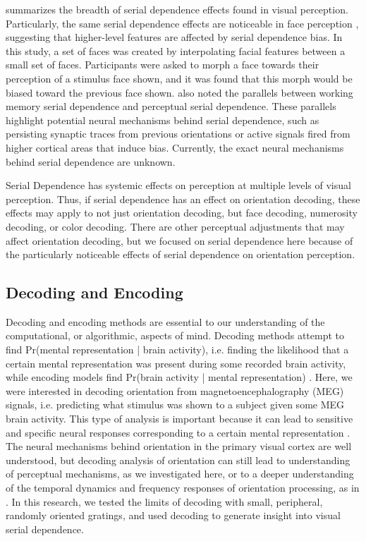 \documentclass[../main.tex]{subfiles}
\begin{document}
\cite{KIYONAGA2017493} summarizes the breadth of serial dependence effects found in visual perception. Particularly, the same serial dependence effects are noticeable in face perception \citep{liberman_2014}, suggesting that higher-level features are affected by serial dependence bias. In this study, a set of faces was created by interpolating facial features between a small set of faces. Participants were asked to morph a face towards their perception of a stimulus face shown, and it was found that this morph would be biased toward the previous face shown. \cite{KIYONAGA2017493} also noted the parallels between working memory serial dependence and perceptual serial dependence. These parallels highlight potential neural mechanisms behind serial dependence, such as persisting synaptic traces from previous orientations or active signals fired from higher cortical areas that induce bias. Currently, the exact neural mechanisms behind serial dependence are unknown.

Serial Dependence has systemic effects on perception at multiple levels of visual perception. Thus, if serial dependence has an effect on orientation decoding, these effects may apply to not just orientation decoding, but face decoding, numerosity decoding, or color decoding. There are other perceptual adjustments that may affect orientation decoding, but we focused on serial dependence here because of the particularly noticeable effects of serial dependence on orientation perception.

\subsection{Decoding and Encoding}
Decoding and encoding methods are essential to our understanding of the computational, or algorithmic, aspects of mind. Decoding methods attempt to find Pr(mental representation | brain activity), i.e. finding the likelihood that a certain mental representation was present during some recorded brain activity, while encoding models find Pr(brain activity | mental representation) \citep{king_2018}. Here, we were interested in decoding orientation from magnetoencephalography (MEG) signals, i.e. predicting what stimulus was shown to a subject given some MEG brain activity. This type of analysis is important because it can lead to sensitive and specific neural responses corresponding to a certain mental representation \citep{king_2018}. The neural mechanisms behind orientation in the primary visual cortex \citep{hubel_wiesel_1959} are well understood, but decoding analysis of orientation can still lead to understanding of perceptual mechanisms, as we investigated here, or to a deeper understanding of the temporal dynamics and frequency responses of orientation processing, as in \cite{GARCIA2013515}. In this research, we tested the limits of decoding with small, peripheral, randomly oriented gratings, and used decoding to generate insight into visual serial dependence.
\end{document}
